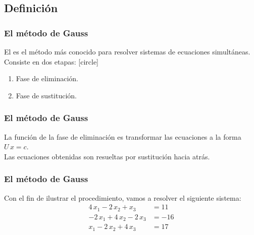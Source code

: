 \subsection{Definición}
\begin{frame}
\frametitle{El método de Gauss}
El  es el método más conocido para resolver sistemas de ecuaciones simultáneas.
\\
\bigskip
Consiste en dos etapas:
[circle]
\begin{enumerate}[<+->]
\item Fase de eliminación.
\item Fase de sustitución.
\end{enumerate}
\end{frame}
\begin{frame}
\frametitle{El método de Gauss}
La función de la fase de eliminación es transformar las ecuaciones a la forma $U \, x = c$.
\\
\bigskip
Las ecuaciones obtenidas son resueltas por sustitución hacia atrás.
\end{frame}
\begin{frame}
\frametitle{El método de Gauss}
Con el fin de ilustrar el procedimiento, vamos a resolver el siguiente sistema:
\begin{align}
4 \, x_{1} - 2 \, x_{2} + x_{3} &= 11 \label{eq:ecuacion_a} \\
-2 \, x_{1} + 4 \, x_{2} - 2 \, x_{3} &= -16 \label{eq:ecuacion_b} \\
x_{1} - 2 \, x_{2} + 4 \, x_{3} &= 17 \label{eq:ecuacion_c}
\end{align}
\end{frame}
